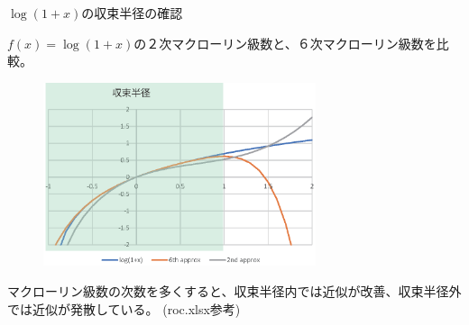\begin{slide}{$\log(1+x)$の収束半径の確認}

$f(x) = \log(1+x)$の２次マクローリン級数と、６次マクローリン級数を比較。

\begin{figure}[h]
\includegraphics[width=8cm]{calculus9/roc.eps}
\end{figure}
マクローリン級数の次数を多くすると、収束半径内では近似が改善、収束半径外では近似が発散している。
(roc.xlsx参考)

\end{slide}





